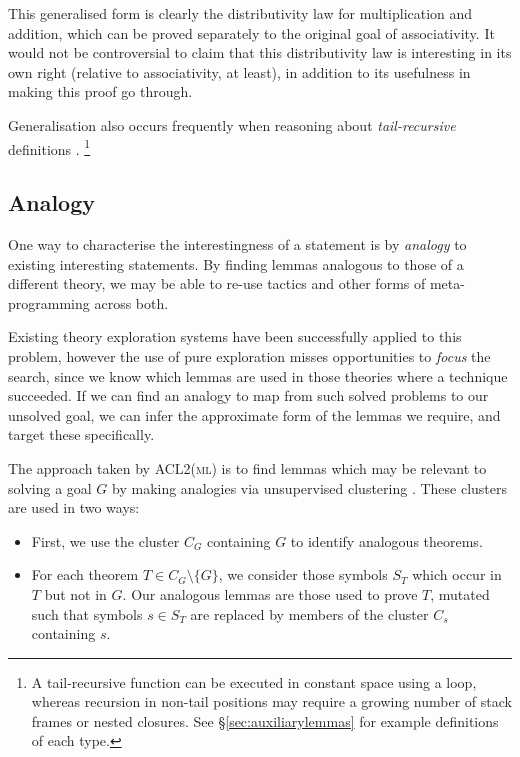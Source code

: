This generalised form is clearly the distributivity law for multiplication and addition, which can be proved separately to the original goal of associativity. It would not be controversial to claim that this distributivity law is interesting in its own right (relative to associativity, at least), in addition to its usefulness in making this proof go through.


Generalisation also occurs frequently when reasoning about \emph{tail-recursive} definitions \citep{kapur2003automatic}. \footnote{A tail-recursive function can be executed in constant space using a loop, whereas recursion in non-tail positions may require a growing number of stack frames or nested closures. See \S \ref{sec:auxiliarylemmas} for example definitions of each type.}

\subsection{Analogy}

One way to characterise the interestingness of a statement is by \emph{analogy} to existing interesting statements. By finding lemmas analogous to those of a different theory, we may be able to re-use tactics and other forms of meta-programming across both.

Existing theory exploration systems have been successfully applied to this problem, however the use of pure exploration misses opportunities to \emph{focus} the search, since we know which lemmas are used in those theories where a technique succeeded. If we can find an analogy to map from such solved problems to our unsolved goal, we can infer the approximate form of the lemmas we require, and target these specifically.

The approach taken by \textsc{ACL2(ml)} is to find lemmas which may be relevant to solving a goal $G$ by making analogies via unsupervised clustering \citep{Heras.Komendantskaya.Johansson.ea:2013}. These clusters are used in two ways:

\begin{itemize}

  \item First, we use the cluster $C_G$ containing $G$ to identify analogous theorems.

  \item For each theorem $T \in C_G \setminus \{G\}$, we consider those symbols $S_T$ which occur in $T$ but not in $G$. Our analogous lemmas are those used to prove $T$, mutated such that symbols $s \in S_T$ are replaced by members of the cluster $C_s$ containing $s$.

\end{itemize}

